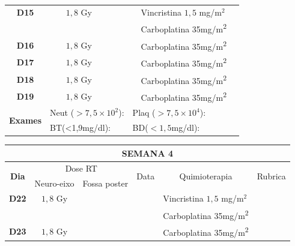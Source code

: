 \documentclass[11pt,a4paper,oldfontcommands]{memoir}
\begin{document}
\begin{center}
\begin{table}[H]
\begin{tabular}{p{1cm}p{2cm}|p{2cm}|p{1cm}|p{4cm}|p{3cm}}
	\hline
	\multicolumn{1}{c|}{\multirow{1}{*}{\textbf{D15}}}&\multicolumn{1}{c|}{\(1,8\) Gy}&&&{Vincristina \(1,5\) mg/m\(^2\)}&\\
	\multicolumn{1}{c|}{\multirow{1}{*}{\textbf{}}}&\multicolumn{1}{c|}{}&&&{Carboplatina 35mg/m\textsuperscript{2}}&\\
    \multicolumn{1}{c|}{\multirow{1}{*}{\textbf{D16}}}&\multicolumn{1}{c|}{\(1,8\) Gy}&&&{Carboplatina 35mg/m\textsuperscript{2}}&\\
    \multicolumn{1}{c|}{\multirow{1}{*}{\textbf{D17}}}&\multicolumn{1}{c|}{\(1,8\) Gy}&&&{Carboplatina 35mg/m\textsuperscript{2}}&\\
    \multicolumn{1}{c|}{\multirow{1}{*}{\textbf{D18}}}&\multicolumn{1}{c|}{\(1,8\) Gy}&&&{Carboplatina 35mg/m\textsuperscript{2}}&\\
    \multicolumn{1}{c|}{\multirow{1}{*}{\textbf{D19}}}&\multicolumn{1}{c|}{\(1,8\) Gy}&&&{Carboplatina 35mg/m\textsuperscript{2}}&\\
    \hline
    \multicolumn{1}{c|}{\multirow{2}{*}{\textbf{Exames}}}&\multicolumn{2}{l|}{Neut (\(>7,5\times10^2\)):}&\multicolumn{2}{l|}{Plaq (\(>7,5\times10^4\)):}&\\
    \cline{2-6}
    \multicolumn{1}{c|}{\multirow{2}{*}{{}}}&\multicolumn{2}{l|}{BT(<1,9mg/dl):}&\multicolumn{2}{l|}{BD(\(<1,5\)mg/dl):}&
    \\
    \hline
\end{tabular}
\end{table}
\begin{table}[H]
\begin{tabular}{p{1cm}p{2cm}|p{2cm}|p{1cm}|p{4cm}|p{3cm}}
	\hline
	\multicolumn{6}{c}{\textbf{SEMANA 4}}\\
\hline
    \multicolumn{1}{c|}{\multirow{2}{*}{\textbf{Dia}}}&\multicolumn{2}{c|}{Dose RT}&\multicolumn{1}{c|}{\multirow{2}{*}{Data}}&\multicolumn{1}{c|}{\multirow{2}{*}{Quimioterapia}}&\multicolumn{1}{c}{\multirow{2}{*}{Rubrica}} \\
    \cline{2-3}
    \multicolumn{1}{c|}{\multirow{1}{*}{}}&{Neuro-eixo}&{Fossa poster}&& \\
	\hline
	\multicolumn{1}{c|}{\multirow{1}{*}{\textbf{D22}}}&\multicolumn{1}{c|}{\(1,8\) Gy}&&&{Vincristina \(1,5\) mg/m\(^2\)}&\\
	\multicolumn{1}{c|}{\multirow{1}{*}{\textbf{}}}&\multicolumn{1}{c|}{}&&&{Carboplatina 35mg/m\textsuperscript{2}}&\\
    \multicolumn{1}{c|}{\multirow{1}{*}{\textbf{D23}}}&\multicolumn{1}{c|}{\(1,8\) Gy}&&&{Carboplatina 35mg/m\textsuperscript{2}}&\\

\end{tabular}
\end{table}
\end{center}
\end{document}

